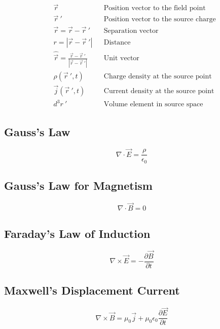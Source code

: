 \begin{align*}
&\vec{r} && \text{Position vector to the field point} \\
&\vec{r}~' && \text{Position vector to the source charge} \\
&\vec{r} = \vec{r} - \vec{r}~' && \text{Separation vector} \\
&r = |\vec{r} - \vec{r}~'| && \text{Distance} \\
&\hat{\vec{r}} = \frac{\vec{r} - \vec{r}~'}{|\vec{r} - \vec{r}~'|} && \text{Unit vector} \\
&\rho(\vec{r}~', t) && \text{Charge density at the source point} \\
&\vec{j}(\vec{r}~', t) && \text{Current density at the source point} \\
&d^3r~' && \text{Volume element in source space}
\end{align*}

\subsection{Gauss's Law}
\begin{equation}
    \nabla \cdot \vec{E} = \frac{\rho}{\epsilon_0}
\end{equation}

\subsection{Gauss's Law for Magnetism}
\begin{equation}
    \nabla \cdot \vec{B} = 0
\end{equation}

\subsection{Faraday's Law of Induction}
\begin{equation}
    \nabla \times \vec{E} = -\frac{\partial \vec{B}}{\partial t}
\end{equation}

\subsection{Maxwell's Displacement Current}
\begin{equation}
    \nabla \times \vec{B} = \mu_0 \vec{j} + \mu_0 \epsilon_0 \frac{\partial \vec{E}}{\partial t}
\end{equation}

